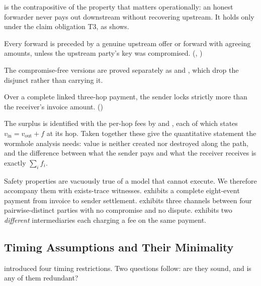  is the contrapositive of the property that matters
operationally: an honest forwarder never pays out downstream without recovering
upstream. It holds only under the claim obligation T3, as
 shows.

\begin{thrm}
\label{thm:causality}
Every forward is preceded by a genuine upstream offer or forward with agreeing
amounts, unless the upstream party's key was compromised.
\hfill(, )
\end{thrm}

The compromise-free versions are proved separately as
 and
, which drop the disjunct rather than
carrying it.

\begin{thrm}
\label{thm:value}
Over a complete linked three-hop payment, the sender locks strictly more than
the receiver's invoice amount.
\hfill()
\end{thrm}

The surplus is identified with the per-hop fees by
 and , each of which
states $v_{\mathrm{in}} = v_{\mathrm{out}} + f$ at its hop. Taken together
these give the quantitative statement the wormhole analysis needs: value is
neither created nor destroyed along the path, and the difference between what
the sender pays and what the receiver receives is exactly $\sum_i f_i$.

Safety properties are vacuously true of a model that cannot execute. We
therefore accompany them with exists-trace witnesses.
 exhibits a complete eight-event payment from
invoice to sender settlement.  exhibits
three channels between four pairwise-distinct parties with no compromise and no
dispute.  exhibits two \emph{different}
intermediaries each charging a fee on the same payment.

\subsection{Timing Assumptions and Their Minimality}
\label{sec:minimality}

 introduced four timing restrictions. Two questions follow:
are they sound, and is any of them redundant?

